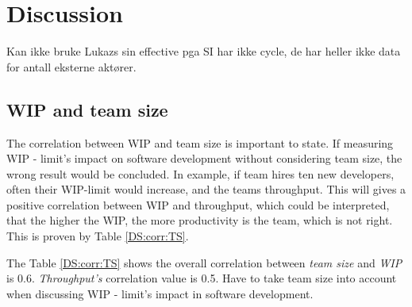 \documentclass[UKenglish]{ifimaster}  %
\begin{document}
 \begin{table}[!htbp]
 \centering
 \caption{Average of team size and WIP}
 \label{DS:corr:WIP:Team}
 \end{table}


 
\chapter{Discussion}
 Kan ikke bruke Lukazs sin effective pga SI har ikke cycle, de har heller ikke data for antall eksterne aktører. 
\label{ch:dis}
\section{WIP and team size}
The correlation between WIP and team size is important to state. If measuring WIP - limit's impact on software development without considering team size, the wrong result would be concluded. In example, if team hires ten new developers, often their WIP-limit would increase, and the teams throughput. This will gives a positive correlation between WIP and throughput, which could be interpreted, that the higher the WIP, the more productivity is the team, which is not right. This is proven by Table \ref{DS:corr:TS}.

The Table \ref{DS:corr:TS} shows the overall correlation between \textit{team size} and \textit{WIP} is 0.6. \textit{Throughput's} correlation value is 0.5. Have to take team size into account when discussing WIP - limit's impact in software development. 
\end{document}

